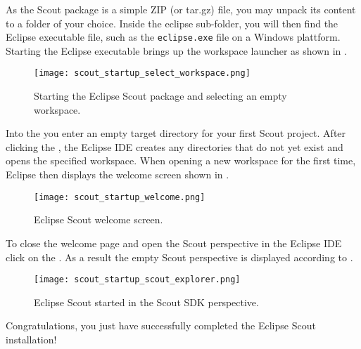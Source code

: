 %

As the Scout package is a simple ZIP (or tar.gz) file, you may unpack its content to a folder of your choice.
Inside the eclipse sub-folder, you will then find the Eclipse executable file, such as the \texttt{eclipse.exe} file on a Windows plattform. 
Starting the Eclipse executable brings up the workspace launcher as shown in .

\begin{figure}
\texttt{[image: scout\_startup\_select\_workspace.png]}
\caption{Starting the Eclipse Scout package and selecting an empty workspace.}
\end{figure}

Into the  you enter an empty target directory for your first Scout project. 
After clicking the , the Eclipse IDE creates any directories that do not yet exist and opens the specified workspace. 
When opening a new workspace for the first time, Eclipse then displays the welcome screen shown in . 

\begin{figure}
\texttt{[image: scout\_startup\_welcome.png]}
\caption{Eclipse Scout welcome screen.}
\end{figure}

To close the welcome page and open the Scout perspective in the Eclipse IDE click on the . 
As a result the empty Scout perspective is displayed according to . 

\begin{figure}
\texttt{[image: scout\_startup\_scout\_explorer.png]}
\caption{Eclipse Scout started in the Scout SDK perspective. }
\end{figure}

Congratulations, you just have successfully completed the Eclipse Scout installation!

